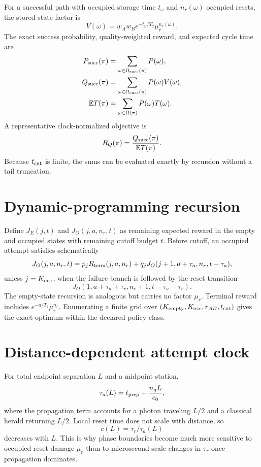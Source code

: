 \documentclass[aps,prx,preprint,superscriptaddress,nofootinbib,longbibliography]{revtex4-2}
\newcommand{\E}{\mathbb E}\newcommand{\Prob}{\mathbb P}
\begin{document}
For a successful path with occupied storage time $t_\omega$ and $n_r(\omega)$ occupied resets, the stored-state factor is
\begin{equation}
 V(\omega)=w_Aw_Be^{-t_\omega/T_2}\mu_r^{n_r(\omega)}.
\end{equation}
The exact success probability, quality-weighted reward, and expected cycle time are
\begin{align}
 P_{\rm succ}(\pi)&=\sum_{\omega\in\Omega_{\rm succ}(\pi)}P(\omega),\\
 Q_{\rm succ}(\pi)&=\sum_{\omega\in\Omega_{\rm succ}(\pi)}P(\omega)V(\omega),\\
 \E T(\pi)&=\sum_{\omega\in\Omega(\pi)}P(\omega)T(\omega).
\end{align}
A representative clock-normalized objective is
\begin{equation}
 R_Q(\pi)=\frac{Q_{\rm succ}(\pi)}{\E T(\pi)}.
\end{equation}
Because $t_{\rm cut}$ is finite, the sums can be evaluated exactly by recursion without a tail truncation.

\section{Dynamic-programming recursion}
Define $J_E(j,t)$ and $J_O(j,a,n_r,t)$ as remaining expected reward in the empty and occupied states with remaining cutoff budget $t$. Before cutoff, an occupied attempt satisfies schematically
\begin{equation}
 J_O(j,a,n_r,t)=p_jR_{\rm term}(j,a,n_r)+q_jJ_O(j+1,a+\tau_a,n_r,t-\tau_a),
\end{equation}
unless $j=K_{\rm occ}$, when the failure branch is followed by the reset transition
\begin{equation}
 J_O(1,a+\tau_a+\tau_r,n_r+1,t-\tau_a-\tau_r).
\end{equation}
The empty-state recursion is analogous but carries no factor $\mu_r$. Terminal reward includes $e^{-a/T_2}\mu_r^{n_r}$. Enumerating a finite grid over $(K_{\rm empty},K_{\rm occ},r_{AB},t_{\rm cut})$ gives the exact optimum within the declared policy class.

\section{Distance-dependent attempt clock}
For total endpoint separation $L$ and a midpoint station,
\begin{equation}
 \tau_a(L)=t_{\rm prep}+\frac{n_gL}{c_0},
\end{equation}
where the propagation term accounts for a photon traveling $L/2$ and a classical herald returning $L/2$. Local reset time does not scale with distance, so
\begin{equation}
 c(L)=\tau_r/\tau_a(L)
\end{equation}
decreases with $L$. This is why phase boundaries become much more sensitive to occupied-reset damage $\mu_r$ than to microsecond-scale changes in $\tau_r$ once propagation dominates.
\end{document}
